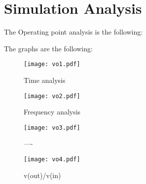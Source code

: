 \section{Simulation Analysis}
\label{sec:simulation}

The Operating point analysis is the following:


The graphs are the following:


\begin{figure}[H] \centering
\texttt{[image: vo1.pdf]}
\caption{Time analysis}
\label{fig:acm}
\end{figure}


\begin{figure}[H] \centering
\texttt{[image: vo2.pdf]}
\caption{Frequency analysis}
\label{fig:acm}
\end{figure}


\begin{figure}[H] \centering
\texttt{[image: vo3.pdf]}
\caption{----}
\label{fig:acm}
\end{figure}

\begin{figure}[H] \centering
\texttt{[image: vo4.pdf]}
\caption{v(out)/v(in)}
\label{fig:acm}
\end{figure}